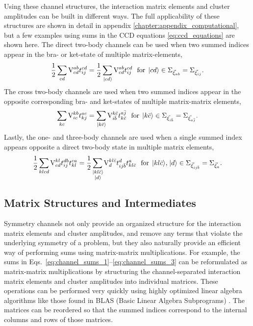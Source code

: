 \documentclass[thesis.tex]{subfiles}
\begin{document}
Using these channel structures, the interaction matrix elements and cluster amplitudes can be built in different ways.  The full applicability of these structures are shown in detail in appendix \ref{chapter:appendix_computational}, but a few examples using sums in the CCD equations \eqref{eq:ccd_equations} are shown here.  The direct two-body channels can be used when two summed indices appear in the bra- or ket-state of multiple matrix-elements,
\begin{equation} \label{eq:channel_sums_1}
  \frac{1}{2}\sum\limits_{\mathclap{cd}}\vint{ab}{cd}\tamp{cd}{ij} = \frac{1}{2}\sum\limits_{\mathclap{\ket{cd}}}\vint{ab}{cd}\tamp{cd}{ij}\ \ \text{for}\ \ket{cd} \in \Sigma_{\vec{\xi}_{ab}}=\Sigma_{\vec{\xi}_{ij}}.
\end{equation}
The cross two-body channels are used when two summed indices appear in the opposite corresponding bra- and ket-states of multiple matrix-matrix elements,
\begin{equation} \label{eq:channel_sums_2}
  \sum\limits_{\mathclap{kc}}\vint{kb}{ic}\tamp{ac}{kj} = \sum\limits_{\mathclap{\ket{k\bar{c}}}}\vint{k\bar{c}}{i\bar{b}}\tamp{a\bar{j}}{k\bar{c}}\ \ \text{for}\ \ket{k\bar{c}} \in \Sigma_{\vec{\xi}_{i\bar{b}}}=\Sigma_{\vec{\xi}_{a\bar{j}}}.
\end{equation}
Lastly, the one- and three-body channels are used when a single summed index appears opposite a direct two-body state in multiple matrix elements,
\begin{equation} \label{eq:channel_sums_3}
  \frac{1}{2}\sum\limits_{\mathclap{klcd}}\vint{kl}{cd}\tamp{db}{ij}\tamp{ca}{kl} = \frac{1}{2}\sum\limits_{\mathclap{\substack{\ket{kl\bar{c}} \\ \ket{d}}}}\vint{kl\bar{c}}{d}\tamp{d}{ij\bar{b}}\tamp{a}{kl\bar{c}}\ \ \text{for}\ \ket{kl\bar{c}},\ket{d} \in \Sigma_{\vec{\xi}_{ij\bar{b}}}=\Sigma_{\vec{\xi}_{a}}.
\end{equation}


\subsection{Matrix Structures and Intermediates} \label{section:maxtrix_intermediates}

Symmetry channels not only provide an organized structure for the interaction matrix elements and cluster amplitudes, and remove any terms that violate the underlying symmetry of a problem, but they also naturally provide an efficient way of performing sums using matrix-matrix multiplications.  For example, the sums in Eqs.\ \eqref{eq:channel_sums_1}--\eqref{eq:channel_sums_3} can be reformulated as matrix-matrix multiplications by structuring the channel-separated interaction matrix elements and cluster amplitudes into individual matrices.  These operations can be performed very quickly using highly optimized linear algebra algorithms like those found in BLAS (Basic Linear Algebra Subprograms) \cite{blas}.  The matrices can be reordered so that the summed indices correspond to the internal columns and rows of those matrices.
\end{document}
